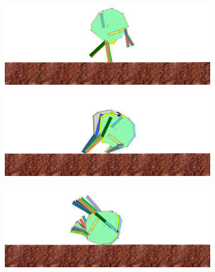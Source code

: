           \begin{figure}[H]
            \centering
            \begin{subfigure}[b]{0.45\textwidth}
              \includegraphics[width=\linewidth,center]{graphics/simulation-results/4_gen200_1}
              \caption{\label{fig:gen200_1}}
            \end{subfigure}
            \begin{subfigure}[b]{0.45\textwidth}
              \includegraphics[width=\linewidth,center]{graphics/simulation-results/4_gen200_2}
              \caption{\label{fig:gen200_2}}
            \end{subfigure}
            \begin{subfigure}[b]{0.45\textwidth}
              \includegraphics[width=\linewidth,center]{graphics/simulation-results/4_gen200_3}
              \caption{\label{fig:gen200_3}}
            \end{subfigure}
            \begin{subfigure}[b]{0.45\textwidth}

\end{subfigure}
\end{figure}
